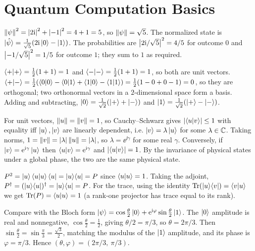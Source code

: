 \chapter{Quantum Computation Basics}

\begin{solution}
$\left\lVert \psi \right\rVert^{2}=\left\lvert 2\mathrm{i} \right\rvert^{2}+\left\lvert -1 \right\rvert^{2}=4+1=5$, so $\left\lVert \psi \right\rVert=\sqrt5$. The
normalized state is $\ket{\hat\psi}=\tfrac{1}{\sqrt5}(2\mathrm{i}\ket{0}-\ket{1})$. The
probabilities are $\left\lvert 2\mathrm{i}/\sqrt5 \right\rvert^{2}=4/5$ for outcome $0$ and
$\left\lvert -1/\sqrt5 \right\rvert^{2}=1/5$ for outcome $1$; they sum to $1$ as required.
\end{solution}

\begin{solution}
$\braket{+|+}=\tfrac12(1+1)=1$ and $\braket{-|-}=\tfrac12(1+1)=1$, so both are unit
vectors. $\braket{+|-}=\tfrac12(\braket{0|0}-\braket{0|1}+\braket{1|0}-\braket{1|1})=\tfrac12(1-0+0-1)=0$,
so they are orthogonal; two orthonormal vectors in a $2$-dimensional space form a
basis. Adding and subtracting, $\ket{0}=\tfrac{1}{\sqrt2}(\ket{+}+\ket{-})$ and
$\ket{1}=\tfrac{1}{\sqrt2}(\ket{+}-\ket{-})$.
\end{solution}

\begin{solution}
For unit vectors, $\left\lVert u \right\rVert=\left\lVert v \right\rVert=1$, so Cauchy--Schwarz gives
$\left\lvert \braket{u|v} \right\rvert\le1$ with equality iff $\ket{u},\ket{v}$ are linearly dependent,
i.e. $\ket{v}=\lambda\ket{u}$ for some $\lambda\in\mathbb{C}$. Taking norms,
$1=\left\lVert v \right\rVert=\left\lvert \lambda \right\rvert\left\lVert u \right\rVert=\left\lvert \lambda \right\rvert$, so $\lambda=\ee^{\ii\gamma}$ for some
real $\gamma$. Conversely, if $\ket{v}=\mathrm{e}^{\mathrm{i}\gamma}\ket{u}$ then
$\braket{u|v}=\mathrm{e}^{\mathrm{i}\gamma}$ and $\left\lvert \braket{u|v} \right\rvert=1$. By the invariance of
physical states under a global phase, the two are the same physical state.
\end{solution}

\begin{solution}
$P^{2}=\ket{u}\braket{u|u}\bra{u}=\ket{u}\!\bra{u}=P$ since $\braket{u|u}=1$. Taking the
adjoint, $P^{\dagger}=(\ket{u}\!\bra{u})^{\dagger}=\ket{u}\!\bra{u}=P$. For the trace, using the identity
$\operatorname{Tr}(\ket{u}\!\bra{v})=\braket{v|u}$ we get $\operatorname{Tr}(P)=\braket{u|u}=1$ (a rank-one
projector has trace equal to its rank).
\end{solution}

\begin{solution}
Compare with the Bloch form
$\ket{\psi}=\cos\tfrac{\theta}{2}\ket{0}+\mathrm{e}^{\mathrm{i}\varphi}\sin\tfrac{\theta}{2}\ket{1}$.
The $\ket{0}$ amplitude is real and nonnegative, $\cos\tfrac{\theta}{2}=\tfrac12$,
giving $\theta/2=\pi/3$, so $\theta=2\pi/3$. Then
$\sin\tfrac{\theta}{2}=\sin\tfrac{\pi}{3}=\tfrac{\sqrt3}{2}$, matching the modulus of
the $\ket{1}$ amplitude, and its phase is $\varphi=\pi/3$. Hence
$(\theta,\varphi)=(2\pi/3,\ \pi/3)$.
\end{solution}

